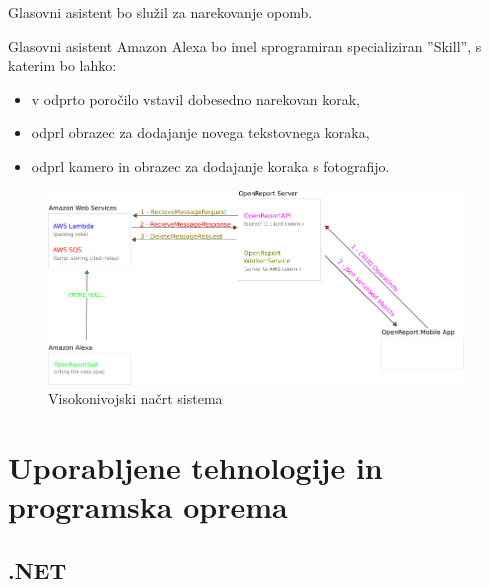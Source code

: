 \documentclass[a4paper, 12pt]{book}
\begin{document}
Glasovni asistent bo služil za narekovanje opomb.


Glasovni asistent Amazon Alexa bo imel sprogramiran specializiran ''Skill'', s katerim bo lahko:

\begin{itemize}
	\item v odprto poročilo vstavil dobesedno narekovan korak,
	\item odprl obrazec za dodajanje novega tekstovnega koraka,
	\item odprl kamero in obrazec za dodajanje koraka s fotografijo.
\end{itemize}
% 
% 

\begin{figure}[H]
\begin{center}
\includegraphics[width=11cm]{plan}
\end{center}
\caption{Visokonivojski načrt sistema}
\label{plan}
\end{figure}

\section{Uporabljene tehnologije in programska oprema}

\subsection{.NET}
\end{document}
